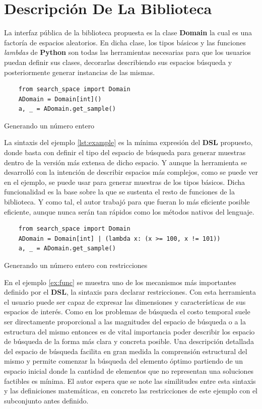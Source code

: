 \section{Descripción De La Biblioteca}\label{section:describe}

La interfaz pública de la biblioteca propuesta es la clase {\bf Domain} la cual es una factoría de espacios
aleatorios. En dicha clase, los tipos básicos y las funciones {\it lambdas} de {\bf Python} son todas
las herramientas necesarias para que los usuarios puedan definir sus clases, decorarlas describiendo
sus espacios búsqueda y posteriormente generar instancias de las mismas.


\begin{listing}[!ht]
    \begin{verbatim}
    from search_space import Domain
    ADomain = Domain[int]()
    a, _ = ADomain.get_sample()
    \end{verbatim}
    \caption{Generando un número entero}
    \label{lst:example}
\end{listing}

La sintaxis del ejemplo \ref{lst:example} es la mínima expresión del {\bf DSL} propuesto, donde basta con
definir el tipo del espacio de búsqueda para generar muestras dentro de la versión más extensa de dicho
espacio. Y aunque la herramienta se desarrolló con la intención de describir espacios más complejos,
como se puede ver en el ejemplo, se puede usar para generar muestras de los tipos básicos. Dicha
funcionalidad es la base sobre la que se sustenta el resto de funciones de la biblioteca.
Y como tal, el autor trabajó para que fueran lo más eficiente posible eficiente, aunque nunca serán
tan rápidos como los métodos nativos del lenguaje.

\begin{listing}[!ht]
    \begin{verbatim}
    from search_space import Domain
    ADomain = Domain[int] | (lambda x: (x >= 100, x != 101))
    a, _ = ADomain.get_sample()
    \end{verbatim}
    \caption{Generando un número entero con restricciones}
    \label{ex:func}
\end{listing}


En el ejemplo \ref{ex:func} se muestra uno de los mecanismos más importantes definido por el
    {\bf DSL}, la sintaxis para declarar restricciones. Con esta herramienta el usuario puede ser capaz de
expresar las dimensiones y características de sus espacios de interés. Como en los problemas de búsqueda el
costo temporal suele ser directamente proporcional a las magnitudes del espacio de búsqueda o a la estructura
del mismo entonces es de vital importancia poder describir los espacio de búsqueda de la forma más clara y
concreta posible. Una descripción detallada del espacio de búsqueda facilita en gran medida la comprensión
estructural del mismo y permite comenzar la búsqueda del elemento óptimo partiendo de un espacio inicial donde
la cantidad de elementos que no representan una soluciones factibles es mínima. El autor espera que se note las
similitudes entre esta sintaxis y las definiciones matemáticas, en concreto las restricciones de este ejemplo
con el subconjunto antes definido.

